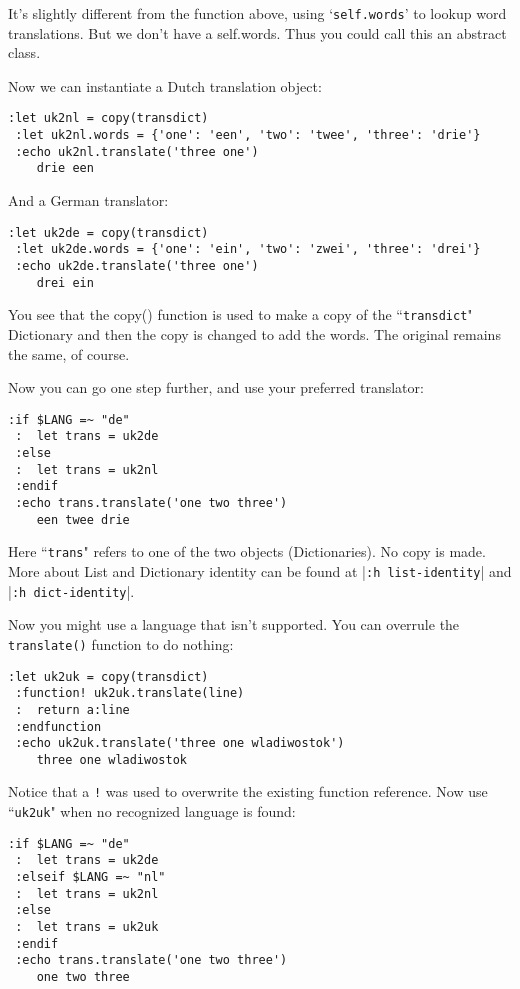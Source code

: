 It's slightly different from the function above, using `\texttt{self.words}' to lookup word translations.
But we don't have a self.words.
Thus you could call this an abstract class.

Now we can instantiate a Dutch translation object:

\begin{Verbatim}[samepage=true]
 :let uk2nl = copy(transdict)
 :let uk2nl.words = {'one': 'een', 'two': 'twee', 'three': 'drie'}
 :echo uk2nl.translate('three one')
    drie een
\end{Verbatim}

And a German translator:

\begin{Verbatim}[samepage=true]
 :let uk2de = copy(transdict)
 :let uk2de.words = {'one': 'ein', 'two': 'zwei', 'three': 'drei'}
 :echo uk2de.translate('three one')
    drei ein
\end{Verbatim}

You see that the copy() function is used to make a copy of the ``\texttt{transdict}" Dictionary and then the copy is changed to add the words.
The original remains the same, of course.

Now you can go one step further, and use your preferred translator:

\begin{Verbatim}[samepage=true]
 :if $LANG =~ "de"
 :  let trans = uk2de
 :else
 :  let trans = uk2nl
 :endif
 :echo trans.translate('one two three')
    een twee drie
\end{Verbatim}

Here ``\texttt{trans}" refers to one of the two objects (Dictionaries).
No copy is made.
More about List and Dictionary identity can be found at |\texttt{:h list-identity}| and |\texttt{:h dict-identity}|.

Now you might use a language that isn't supported.
You can overrule the \texttt{translate()} function to do nothing:

\begin{Verbatim}[samepage=true]
 :let uk2uk = copy(transdict)
 :function! uk2uk.translate(line)
 :  return a:line
 :endfunction
 :echo uk2uk.translate('three one wladiwostok')
    three one wladiwostok
\end{Verbatim}

Notice that a \texttt{!} was used to overwrite the existing function reference.
Now use ``\texttt{uk2uk}" when no recognized language is found:

\begin{Verbatim}[samepage=true]
 :if $LANG =~ "de"
 :  let trans = uk2de
 :elseif $LANG =~ "nl"
 :  let trans = uk2nl
 :else
 :  let trans = uk2uk
 :endif
 :echo trans.translate('one two three')
    one two three
\end{Verbatim}

